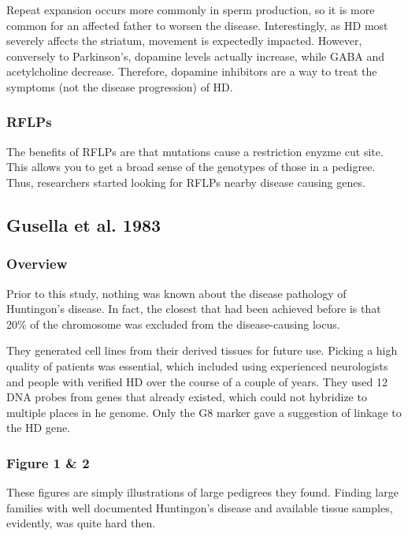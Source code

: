 Repeat expansion occurs more commonly in sperm production, so it is more common for an affected father to worsen the disease. Interestingly, as HD most severely affects the striatum, movement is expectedly impacted. However, conversely to Parkinson's, dopamine levels actually increase, while GABA and acetylcholine decrease. Therefore, dopamine inhibitors are a way to treat the symptoms (not the disease progression) of HD. 

\subsubsection*{RFLPs}

The benefits of RFLPs are that mutations cause a restriction enyzme cut site. This allows you to get a broad sense of the genotypes of those in a pedigree. Thus, researchers started looking for RFLPs nearby disease causing genes. 



\subsection*{Gusella et al. 1983}

\subsubsection*{Overview}
Prior to this study, nothing was known about the disease pathology of Huntingon's disease. In fact, the closest that had been achieved before is that 20\% of the chromosome was excluded from the disease-causing locus.\newline

They generated cell lines from their derived tissues for future use. Picking a high quality of patients was essential, which included using experienced neurologists and people with verified HD over the course of a couple of years. They used 12 DNA probes from genes that already existed, which could not hybridize to multiple places in he genome. Only the G8 marker gave a suggestion of linkage to the HD gene. 

\subsubsection*{Figure 1 \& 2}

These figures are simply illustrations of large pedigrees they found. Finding large families with well documented Huntingon's disease and available tissue samples, evidently, was quite hard then. 

